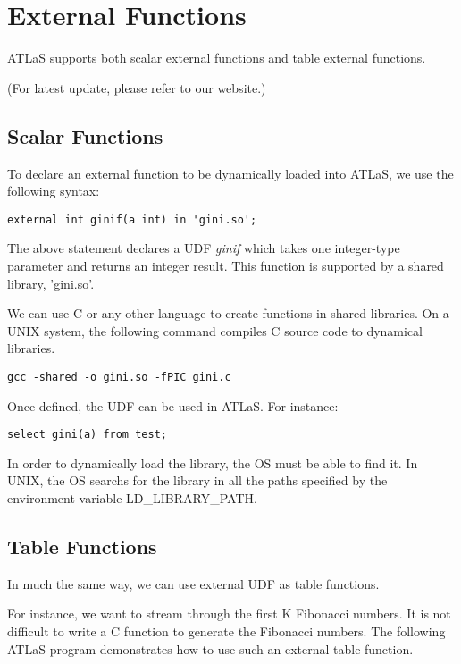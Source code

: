 

\chapter{External Functions}
ATLaS supports both scalar external functions and table external
functions.

(For latest update, please refer to our website.)

\section{Scalar Functions}

To declare an external function to be dynamically loaded into ATLaS, we
use the following syntax:

\begin{verbatim}
external int ginif(a int) in 'gini.so';
\end{verbatim}

The above statement declares a UDF {\it ginif} which takes one
integer-type parameter and returns an integer result. This function is
supported by a shared library, 'gini.so'.

We can use C or any other language to create functions in shared
libraries. On a UNIX system, the following command compiles C source
code to dynamical libraries.

\begin{verbatim}
gcc -shared -o gini.so -fPIC gini.c
\end{verbatim}

Once defined, the UDF can be used in ATLaS. For instance:

\begin{verbatim}
select gini(a) from test;
\end{verbatim}

In order to dynamically load the library, the OS must be able to
find it. In UNIX, the OS searchs for the library in all the paths
specified by the environment variable LD\_LIBRARY\_PATH.

\section{Table Functions}
In much the same way, we can use external UDF as table functions.

For instance, we want to stream through the first K Fibonacci numbers.
It is not difficult to write a C function to generate the Fibonacci
numbers. The following ATLaS program demonstrates how to use such an
external table function.

